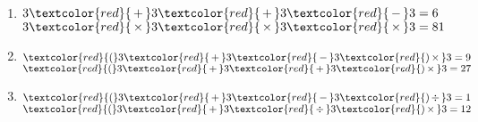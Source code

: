 \begin{corrige}
   \ \\ [-5mm]
   \begin{enumerate}
      \item $3 \textcolor{red}{\,+\,} 3 \textcolor{red}{\,+\,} 3 \textcolor{red}{\,-\,} 3 = 6$ \\
         $3 \textcolor{red}{\,\times\,} 3  \textcolor{red}{\,\times\,} 3  \textcolor{red}{\,\times\,} 3 = 81$ \smallskip
      \item $\textcolor{red}{(} 3 \textcolor{red}{\,+\,} 3 \textcolor{red}{\,-\,} 3 \textcolor{red}{)\,\times\,} 3 = 9$ \\
         $\textcolor{red}{(} 3 \textcolor{red}{\,+\,} 3 \textcolor{red}{\,+\,} 3 \textcolor{red}{)\,\times\,} 3 = 27$ \smallskip
      \item $\textcolor{red}{(} 3 \textcolor{red}{\,+\,} 3 \textcolor{red}{\,-\,} 3 \textcolor{red}{)\,\div\,} 3 = 1$ \\
         $\textcolor{red}{(} 3 \textcolor{red}{\,+\,} 3 \textcolor{red}{\,\div\,} 3 \textcolor{red}{)\,\times\,} 3 = 12$
   \end{enumerate}
\end{corrige}